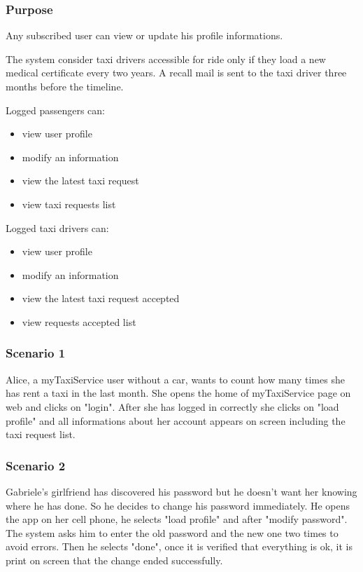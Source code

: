 \label{user-profile}
\subsubsection{Purpose}
Any subscribed user can view or update his profile informations. 

The system consider taxi drivers accessible for ride only if they load a new medical certificate every two years. A recall mail is sent to the taxi driver three months before the timeline. %


Logged passengers can:
\begin{itemize}
\item view user profile
\item modify an information
\item view the latest taxi request
\item view taxi requests list
\end{itemize}

Logged taxi drivers can:
\begin{itemize}
\item view user profile
\item modify an information
\item view the latest taxi request accepted
\item view requests accepted list
\end{itemize}


\subsubsection{Scenario 1}
Alice, a myTaxiService user without a car, wants to count how many times she has rent a taxi in the last month. She opens the home of myTaxiService page on web and clicks on "login". 
After she has logged in correctly she clicks on "load profile" and all informations about her account appears on screen including the taxi request list. 

\subsubsection{Scenario 2}
Gabriele's girlfriend has discovered his password but he doesn't want her knowing where he has done. So he decides to change his password immediately. He opens the app on her cell phone, he selects "load profile" and after "modify password". The system asks him to enter the old password and the new one two times to avoid errors. Then he selects "done", once it is verified that everything is ok, it is print on screen that the change ended successfully.


